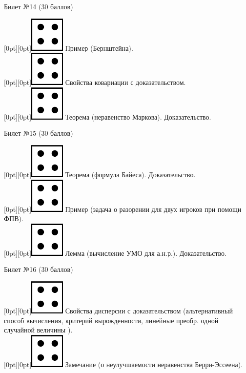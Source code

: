 \documentclass[10pt]{article}
\begin{document}
\begin{center} {\Large Билет №14 (30 баллов)} \end{center}
\raisebox{-1pt}[0pt][0pt]{\includegraphics[width=0.02\linewidth]{4.png}}  Пример (Бернштейна). \\
\raisebox{-1pt}[0pt][0pt]{\includegraphics[width=0.02\linewidth]{4.png}} Свойства ковариации с доказательством. \\
\raisebox{-1pt}[0pt][0pt]{\includegraphics[width=0.02\linewidth]{4.png}} Теорема (неравенство Маркова). Доказательство. \\
\begin{center} {\Large Билет №15 (30 баллов)} \end{center}
\raisebox{-1pt}[0pt][0pt]{\includegraphics[width=0.02\linewidth]{4.png}} Теорема (формула Байеса). Доказательство. \\
\raisebox{-1pt}[0pt][0pt]{\includegraphics[width=0.02\linewidth]{4.png}} Пример (задача о разорении для двух игроков при помощи ФПВ). \\ 
\raisebox{-1pt}[0pt][0pt]{\includegraphics[width=0.02\linewidth]{4.png}} Лемма (вычисление УМО для а.н.р.). Доказательство. \\
\begin{center} {\Large Билет №16 (30 баллов)} \end{center}
\raisebox{-1pt}[0pt][0pt]{\includegraphics[width=0.02\linewidth]{4.png}} Свойства дисперсии с доказательством (альтернативный способ вычисления, критерий вырожденности, линейные преобр. одной случайной величины ). \\ 
\raisebox{-1pt}[0pt][0pt]{\includegraphics[width=0.02\linewidth]{4.png}} Замечание (о неулучшаемости неравенства Берри-Эссеена). \\
\end{document}
